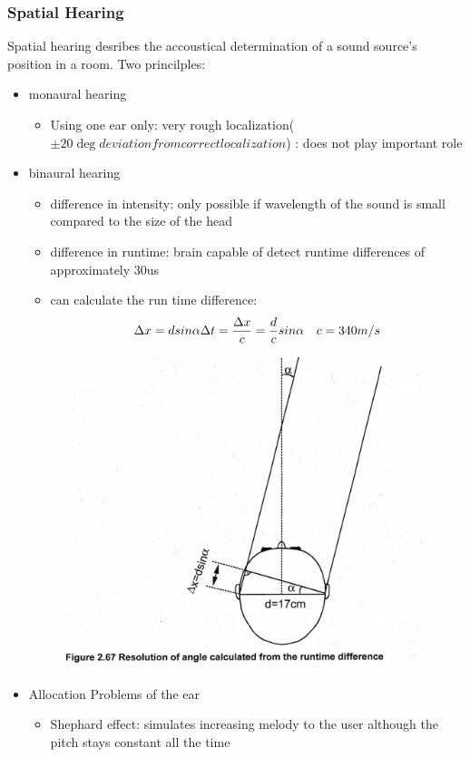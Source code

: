 \documentclass{standalone}
\begin{document}
\subsubsection{Spatial Hearing}
Spatial hearing desribes the accoustical determination of a sound source's position in a room. Two princilples:
\begin{itemize}
	\item monaural hearing
	\begin{itemize}
		\item Using one ear only: very rough localization($\pm 20 \deg deviation from correct localization$) : does not play important role
	\end{itemize}
	\item binaural hearing
	\begin{itemize}
		\item difference in intensity: only possible if wavelength of the sound is small compared to the size of the head
		\item difference in runtime: brain capable of detect runtime differences of approximately 30us
		\item can calculate the run time difference:
		$$
		\Delta x = d sin \alpha \\
		\Delta t = \frac{\Delta x}{c} = \frac{d}{c} sin \alpha \quad c = 340m/s
		$$
	\end{itemize}
	\begin{figure}[H]
			\centering
			\includegraphics[width = 0.7\linewidth]{Figures/2_67.png}
		\end{figure}
	\item Allocation Problems of the ear
			\begin{itemize}
			\item Shephard effect: simulates increasing melody to the user although the pitch stays constant all the time
		\end{itemize}
\end{itemize}
\end{document}
